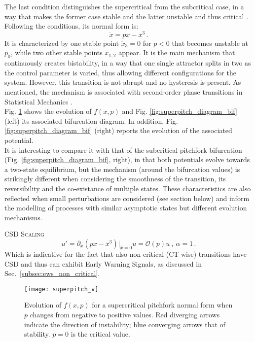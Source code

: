 The last condition distinguishes the supercritical from the subcritical case, in a way that makes the former case stable and the latter unstable and thus critical \citep{kuehn2011mathematical}. Following the conditions, its normal form is:
\begin{equation}
	\dot{x} = px-x^3 \, .
	\label{eq:suppitch}
\end{equation}
It is characterized by one stable point $\tilde{x}_3 = 0$ for $p<0$ that becomes unstable at $p_0$, while two other stable points $\tilde{x}_{1,2}$ appear. It is the main mechanism that continuously creates bistability, in a way that one single attractor splits in two as the control parameter is varied, thus allowing different configurations for the system. However, this transition is not abrupt and no hysteresis is present. As mentioned, the mechanism is associated with second-order phase transitions in Statistical Mechanics \cite{strogatz2018nonlinear}.  \\
Fig. \ref{fig:superpitch_diagram} shows the evolution of $f(x,p)$ and Fig. \ref{fig:superpitch_diagram_bif} (left) its associated bifurcation diagram. In addition, Fig. \ref{fig:superpitch_diagram_bif} (right) reports the evolution of the associated potential. \\
It is interesting to compare it with that of the subcritical pitchfork bifurcation (Fig. \ref{fig:superpitch_diagram_bif}, right), in that both potentials evolve towards a two-state equilibrium, but the mechanism (around the bifurcation values) is strikingly different when considering the smoothness of the transition, its reversibility and the co-existance of multiple states. These characteristics are also reflected when small perturbations are considered (see section below) and inform the modelling of processes with similar asymptotic states but different evolution mechanisms.

\textsc{CSD Scaling}
\begin{equation}
	u' = \partial_x(px-x^3)|_{\hat{x} = 0}u = \mathcal{O}(p) u \ , \ \alpha =1 \, .
\end{equation}
Which is indicative for the fact that also non-critical (CT-wise) transitions have CSD and thus can exhibit Early Warning Signals, as discussed in Sec.~\ref{subsec:ews_non_critical}.


\begin{figure}[h!]
	\centering
	\texttt{[image: superpitch\_v]}
	\caption{\small Evolution of $f(x,p)$ for a supercritical pitchfork normal form when $p$ changes from negative to positive values. Red diverging arrows indicate the direction of instability; blue converging arrows that of stability. $p=0$ is the critical value. }
	\label{fig:superpitch_diagram}
\end{figure}


